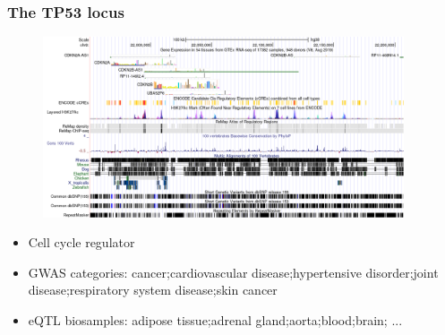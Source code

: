\documentclass{beamer}
\begin{document}
    \begin{frame}
        \frametitle{The TP53 locus}

        \begin{figure}[!]
            \includegraphics[width=0.95\textwidth]{fig/cdk2na}
        \end{figure}

        \begin{itemize}
            \item Cell cycle regulator
            \item GWAS categories: cancer;cardiovascular disease;hypertensive disorder;joint disease;respiratory system disease;skin cancer
            \item eQTL biosamples: adipose tissue;adrenal gland;aorta;blood;brain; ...
        \end{itemize}

    \end{frame}
\end{document}
